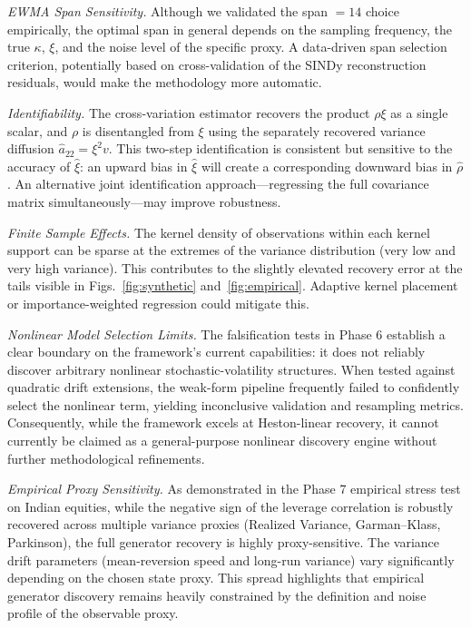 \documentclass[reprint, amsmath, amssymb, aps, prl, superscriptaddress, nofootinbib]{revtex4-2}
\begin{document}
\textit{EWMA Span Sensitivity.}
Although we validated the span $= 14$ choice empirically, the optimal span in
general depends on the sampling frequency, the true $\kappa$, $\xi$, and the
noise level of the specific proxy. A data-driven span selection criterion,
potentially based on cross-validation of the SINDy reconstruction residuals,
would make the methodology more automatic.

\textit{Identifiability.}
The cross-variation estimator recovers the product $\rho\xi$ as a single scalar,
and $\rho$ is disentangled from $\xi$ using the separately recovered variance
diffusion $\hat{a}_{22} = \xi^2 v$. This two-step identification is consistent
but sensitive to the accuracy of $\hat\xi$: an upward bias in $\hat\xi$ will
create a corresponding downward bias in $\hat\rho$. An alternative joint
identification approach---regressing the full covariance matrix simultaneously---may
improve robustness.

\textit{Finite Sample Effects.}
The kernel density of observations within each kernel support can be sparse at
the extremes of the variance distribution (very low and very high variance).
This contributes to the slightly elevated recovery error at the tails visible
in Figs.~\ref{fig:synthetic} and~\ref{fig:empirical}. Adaptive kernel placement
or importance-weighted regression could mitigate this.

\textit{Nonlinear Model Selection Limits.} The falsification tests in Phase 6 establish a clear boundary on the framework's current capabilities: it does not reliably discover arbitrary nonlinear stochastic-volatility structures. When tested against quadratic drift extensions, the weak-form pipeline frequently failed to confidently select the nonlinear term, yielding inconclusive validation and resampling metrics. Consequently, while the framework excels at Heston-linear recovery, it cannot currently be claimed as a general-purpose nonlinear discovery engine without further methodological refinements.

\textit{Empirical Proxy Sensitivity.} As demonstrated in the Phase 7 empirical stress test on Indian equities, while the negative sign of the leverage correlation is robustly recovered across multiple variance proxies (Realized Variance, Garman--Klass, Parkinson), the full generator recovery is highly proxy-sensitive. The variance drift parameters (mean-reversion speed and long-run variance) vary significantly depending on the chosen state proxy. This spread highlights that empirical generator discovery remains heavily constrained by the definition and noise profile of the observable proxy.
\end{document}
